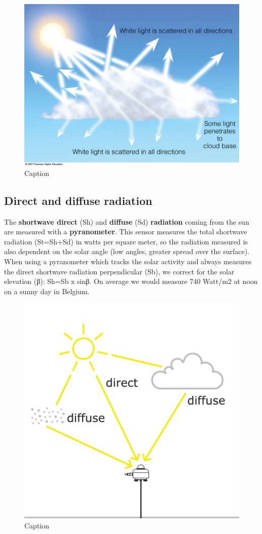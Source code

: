 \documentclass[oneside]{book}
\begin{document}
\begin{figure}

{\centering \includegraphics[width=0.5\linewidth]{figures/Figure126} 

}

\caption{Caption}\label{fig:Scattering3}
\end{figure}

\subsection{Direct and diffuse
radiation}\label{direct-and-diffuse-radiation}

The \textbf{shortwave direct} (Sh) and \textbf{diffuse} (Sd)
\textbf{radiation} coming from the sun are measured with a
\textbf{pyranometer}. This sensor measures the total shortwave radiation
(St=Sh+Sd) in watts per square meter, so the radiation measured is also
dependent on the solar angle (low angles, greater spread over the
surface). When using a pyranometer which tracks the solar activity and
always measures the direct shortwave radiation perpendicular (Sb), we
correct for the solar elevation (β): Sh=Sb x sinβ. On average we would
measure 740 Watt/m2 at noon on a sunny day in Belgium.

\begin{figure}

{\centering \includegraphics[width=0.5\linewidth]{figures/Figure127} 

}

\caption{Caption}\label{fig:Diffuse}
\end{figure}
\end{document}
